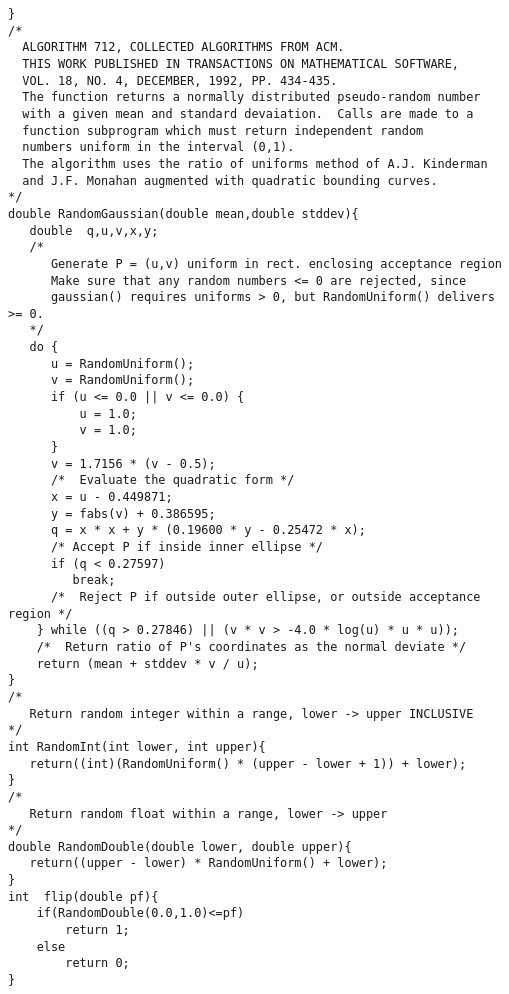 \begin{lstlisting}[style=C]
}
/*
  ALGORITHM 712, COLLECTED ALGORITHMS FROM ACM.
  THIS WORK PUBLISHED IN TRANSACTIONS ON MATHEMATICAL SOFTWARE,
  VOL. 18, NO. 4, DECEMBER, 1992, PP. 434-435.
  The function returns a normally distributed pseudo-random number
  with a given mean and standard devaiation.  Calls are made to a
  function subprogram which must return independent random
  numbers uniform in the interval (0,1).
  The algorithm uses the ratio of uniforms method of A.J. Kinderman
  and J.F. Monahan augmented with quadratic bounding curves.
*/
double RandomGaussian(double mean,double stddev){
   double  q,u,v,x,y;
   /*
      Generate P = (u,v) uniform in rect. enclosing acceptance region
      Make sure that any random numbers <= 0 are rejected, since
      gaussian() requires uniforms > 0, but RandomUniform() delivers >= 0.
   */
   do {
      u = RandomUniform();
      v = RandomUniform();
      if (u <= 0.0 || v <= 0.0) {
          u = 1.0;
          v = 1.0;
      }
      v = 1.7156 * (v - 0.5);
      /*  Evaluate the quadratic form */
      x = u - 0.449871;
      y = fabs(v) + 0.386595;
      q = x * x + y * (0.19600 * y - 0.25472 * x);
      /* Accept P if inside inner ellipse */
      if (q < 0.27597)
         break;
      /*  Reject P if outside outer ellipse, or outside acceptance region */
    } while ((q > 0.27846) || (v * v > -4.0 * log(u) * u * u));
    /*  Return ratio of P's coordinates as the normal deviate */
    return (mean + stddev * v / u);
}
/*
   Return random integer within a range, lower -> upper INCLUSIVE
*/
int RandomInt(int lower, int upper){
   return((int)(RandomUniform() * (upper - lower + 1)) + lower);
}
/*
   Return random float within a range, lower -> upper
*/
double RandomDouble(double lower, double upper){
   return((upper - lower) * RandomUniform() + lower);
}
int  flip(double pf){
    if(RandomDouble(0.0,1.0)<=pf)
        return 1;
    else
        return 0;
}
\end{lstlisting}
\noindent
